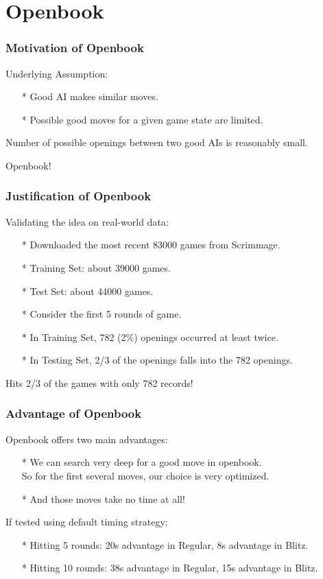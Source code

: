 \documentclass[10pt]{beamer}
\begin{document}
	\section{Openbook}
		\begin{frame}
		\frametitle{Motivation of Openbook}
		Underlying Assumption:
		\begin{itemize}
		\item[*] Good AI makes similar moves.
		\item[*] Possible good moves for a given game state are limited.
		\end{itemize}
		\pause
		Number of possible openings between two good AIs is reasonably small.

		Openbook!
	\end{frame}

	\begin{frame}
		\frametitle{Justification of Openbook}
		Validating the idea on real-world data:\pause
		\begin{itemize}
		\item[*] Downloaded the most recent 83000 games from Scrimmage.
		\item[*] Training Set: about 39000 games.
		\item[*] Test Set: about 44000 games.
		\pause
		\item[*] Consider the first \textcolor{dred}{5} rounds of game.
		\item[*] In Training Set, \textcolor{fgreen}{782} (\textcolor{fgreen}{2\%}) openings occurred at least \textcolor{fgreen}{twice}.
		\item[*] In Testing Set, \textcolor{fgreen}{2/3} of the openings falls into the 782 openings.
		\end{itemize}
		\pause
		Hits \textcolor{fgreen}{2/3} of the games with only \textcolor{fgreen}{782} records!
	\end{frame}

	\begin{frame}
		\frametitle{Advantage of Openbook}
		Openbook offers two main advantages:
		\begin{itemize}
		\item[*] We can search very deep for a good move in openbook.\\
		         So for the first several moves, our choice is very optimized.
		\item[*] And those moves take no time at all!
		\end{itemize}
		\pause
		If tested using default timing strategy:
		\begin{itemize}
		\item[*] Hitting \textcolor{fgreen}{5} rounds: \textcolor{fgreen}{20s} advantage in Regular, \textcolor{fgreen}{8s} advantage in Blitz.
		\item[*] Hitting \textcolor{fgreen}{10} rounds: \textcolor{fgreen}{38s} advantage in Regular, \textcolor{fgreen}{15s} advantage in Blitz.
		\end{itemize}
	\end{frame}
\end{document}
